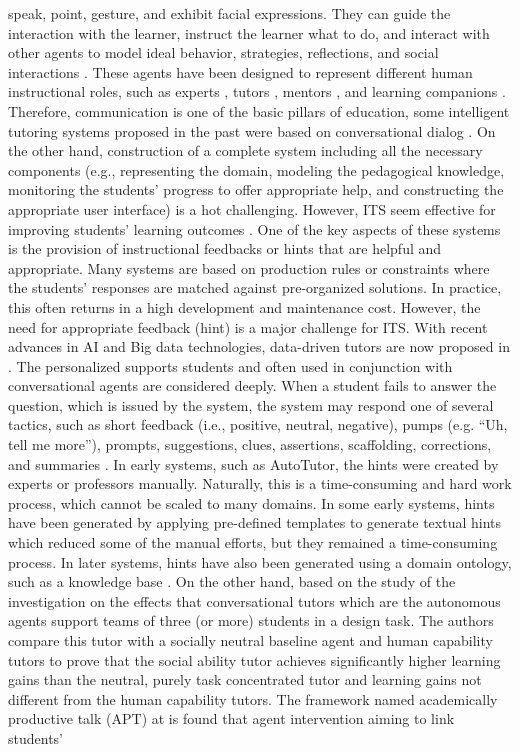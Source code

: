 \documentclass[letterpaper%
, twoside%
, 12pt%
,these%
, english%
,creativecommons,hyperref, withAlgo2e %
]{thETS}
\begin{document}
\begin{introduction}
speak, point, gesture, and exhibit facial expressions.
They can guide the interaction with the learner, instruct
the learner what to do, and interact with other agents to
model ideal behavior, strategies, reflections, and social
interactions \cite{Craig2015}\cite{Graesser2014}\cite{Johnson2016}\cite{Kim2007}. These agents
have been designed to represent different human instructional roles, such as experts \cite{Johnson2000}\cite{Kim2016}, tutors \cite{Nye2014a}\cite{Nye2014b},
mentors \cite{Baylor2005}\cite{Kim2016},
and learning companions \cite{Chan1990}. Therefore, communication is one of the basic pillars of education, some intelligent tutoring systems proposed in the past were based on conversational dialog \cite{Freedman}\cite{Nkambou}. On the other hand, construction of a complete system including all the necessary components (e.g., representing the domain, modeling the pedagogical knowledge, monitoring the students' progress to offer appropriate help, and constructing the appropriate user interface) is a hot challenging. However, ITS seem effective for improving students’ learning outcomes \cite{Bowen}\cite{Pane}. One of the key aspects of these systems is the provision of instructional feedbacks or hints that are helpful and appropriate. Many systems are based on production rules or constraints \cite{Nesbit} where the students' responses are matched against pre-organized solutions. In practice, this often returns in a high development and maintenance cost. However, the need for appropriate feedback (hint) is a major challenge for ITS. With recent advances in AI and Big data technologies, data-driven tutors are now proposed in \cite{Koedinger}. The personalized supports students \cite{Boulay} and often used in conjunction with conversational agents \cite{Lane} are considered deeply. When a student fails to answer the question, which is issued by the system, the system may respond one of several tactics, such as short feedback (i.e., positive, neutral, negative), pumps (e.g. “Uh, tell me more”), prompts, suggestions, clues, assertions, scaffolding, corrections, and summaries \cite{Graesser}. In early systems, such as AutoTutor, the hints were created by experts or professors manually. Naturally, this is a time-consuming and hard work process, which cannot be scaled to many domains. In some early systems, hints have been generated by applying pre-defined templates to generate textual hints \cite{Hume}\cite{Wiemer} which reduced some of the manual efforts, but they remained a time-consuming process. In later systems, hints have also been generated using a domain ontology, such as a knowledge base \cite{Tsovaltzi}\cite{Abhang}. On the other hand,  based on the study of \cite{Kumar} the investigation on the effects that conversational tutors which are the autonomous agents support teams of three (or more) students in a design task. The authors compare this tutor with a socially neutral baseline agent and human capability tutors to prove that the social ability tutor achieves significantly higher learning gains than the neutral, purely task concentrated tutor and learning gains not different from the human capability tutors. The framework named academically productive talk (APT) at \cite {Tegos} is found that agent intervention aiming to link students' 
\end{introduction}
\end{document}
